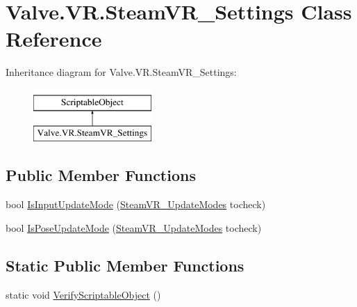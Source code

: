 \hypertarget{class_valve_1_1_v_r_1_1_steam_v_r___settings}{}\section{Valve.\+V\+R.\+Steam\+V\+R\+\_\+\+Settings Class Reference}
\label{class_valve_1_1_v_r_1_1_steam_v_r___settings}
Inheritance diagram for Valve.\+V\+R.\+Steam\+V\+R\+\_\+\+Settings\+:\begin{figure}[H]
\begin{center}
\leavevmode
\includegraphics[height=2.000000cm]{class_valve_1_1_v_r_1_1_steam_v_r___settings}
\end{center}
\end{figure}
\subsection*{Public Member Functions}
\begin{DoxyCompactItemize}
\item 
bool \mbox{\hyperlink{class_valve_1_1_v_r_1_1_steam_v_r___settings_abacc1d252c7c7a6999b84ffd368bbb73}{Is\+Input\+Update\+Mode}} (\mbox{\hyperlink{namespace_valve_1_1_v_r_ac8b0fe3bc9754b0fb9f1351ae3444ac6}{Steam\+V\+R\+\_\+\+Update\+Modes}} tocheck)
\item 
bool \mbox{\hyperlink{class_valve_1_1_v_r_1_1_steam_v_r___settings_a08a595b4924289a51e30bfe4e157c6e5}{Is\+Pose\+Update\+Mode}} (\mbox{\hyperlink{namespace_valve_1_1_v_r_ac8b0fe3bc9754b0fb9f1351ae3444ac6}{Steam\+V\+R\+\_\+\+Update\+Modes}} tocheck)
\end{DoxyCompactItemize}
\subsection*{Static Public Member Functions}
\begin{DoxyCompactItemize}
\item 
static void \mbox{\hyperlink{class_valve_1_1_v_r_1_1_steam_v_r___settings_a4a3c0614cefaa05a3aff934f40702b2f}{Verify\+Scriptable\+Object}} ()
\end{DoxyCompactItemize}
